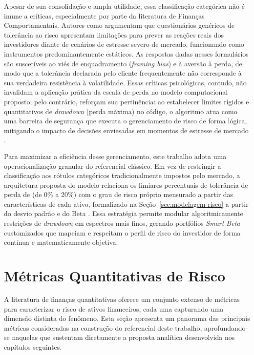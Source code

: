 Apesar de sua consolidação e ampla utilidade, essa classificação categórica não é imune a críticas, especialmente por parte da literatura de Finanças Comportamentais. Autores como  argumentam que questionários genéricos de tolerância ao risco apresentam limitações para prever as reações reais dos investidores diante de cenários de estresse severo de mercado, funcionando como instrumentos predominantemente estáticos. As respostas dadas nesses formulários são suscetíveis ao viés de enquadramento (\textit{framing bias}) e à aversão à perda, de modo que a tolerância declarada pelo cliente frequentemente não corresponde à sua verdadeira resistência à volatilidade. Essas críticas psicológicas, contudo, não invalidam a aplicação prática da escala de perda no modelo computacional proposto; pelo contrário, reforçam sua pertinência: ao estabelecer limites rígidos e quantitativos de \textit{drawdown} (perda máxima) no código, o algoritmo atua como uma barreira de segurança que executa o gerenciamento de risco de forma lógica, mitigando o impacto de decisões enviesadas em momentos de estresse de mercado \cite{kahneman_prospect_1979}.

Para maximizar a eficiência desse gerenciamento, este trabalho adota uma operacionalização granular do referencial clássico. Em vez de restringir a classificação aos rótulos categóricos tradicionalmente impostos pelo mercado, a arquitetura proposta do modelo relaciona os limiares percentuais de tolerância de perda de  (de 0\% a 20\%) com o grau de risco próprio mensurado a partir das características de cada ativo, formalizado na Seção~\ref{sec:modelagem-risco} a partir do desvio padrão e do Beta \cite{assaf_neto_mercado_2022}. Essa estratégia permite modular algoritmicamente restrições de \textit{drawdown} em espectros mais finos, gerando portfólios \textit{Smart Beta} customizados que mapeiam e respeitam o perfil de risco do investidor de forma contínua e matematicamente objetiva.

\section{Métricas Quantitativas de Risco}

A literatura de finanças quantitativas oferece um conjunto extenso de métricas para caracterizar o risco de ativos financeiros, cada uma capturando uma dimensão distinta do fenômeno. Esta seção apresenta um panorama das principais métricas consideradas na construção do referencial deste trabalho, aprofundando-se naquelas que sustentam diretamente a proposta analítica desenvolvida nos capítulos seguintes.

